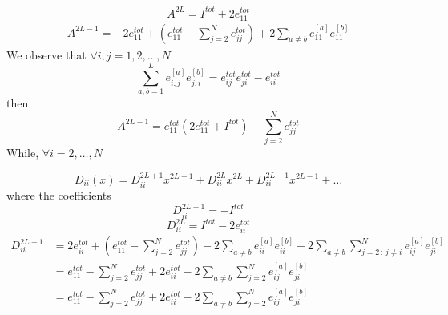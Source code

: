 \documentclass[11pt]{article}
\numberwithin{equation}{section}
\numberwithin{equation}{subsection}
\begin{document}
\begin{equation}
	A^{2L}=I^{tot}+2e_{11}^{tot}
\end{equation}
\begin{equation}
	\begin{split}
		A^{2L-1}=&2e_{11}^{tot}+\left(e_{11}^{tot}-\sum_{j=2}^{N}e_{jj}^{tot}\right)+2\sum_{a\neq b}e_{11}^{[a]}e_{11}^{[b]}
	\end{split}
\end{equation}
We observe that $\forall i,j=1,2,\ldots,N$
\begin{equation}
	\sum_{a,b=1}^{L}e_{i,j}^{[a]}e_{j,i}^{[b]}=e_{ij}^{tot}e_{ji}^{tot}-e_{ii}^{tot}
\end{equation}
then 
\begin{equation}
	\boxed{A^{2L-1}=e_{11}^{tot}\left(2e_{11}^{tot}+I^{tot}\right)-\sum_{j=2}^{N}e_{jj}^{tot}}
\end{equation}
While, $\forall i=2,\ldots,N$


\begin{equation}
	D_{ii}(x)=D_{ii}^{2L+1}x^{2L+1}+D_{ii}^{2L}x^{2L}+D_{ii}^{2L-1}x^{2L-1}+\ldots
\end{equation}
where the coefficients
\begin{equation}\label{a2lp}
	D_{ii}^{2L+1}=-I^{tot}
\end{equation}\begin{equation}\label{a2l}
	D_{ii}^{2L}=I^{tot}-2e_{ii}^{tot}
\end{equation}
\begin{equation}\label{a2lm1}
	\begin{split}
		D_{ii}^{2L-1}&=2e_{ii}^{tot}+\left(e_{11}^{tot}-\sum_{j=2}^{N}e_{jj}^{tot}\right)-2\sum_{a\neq b}e_{ii}^{[a]}e_{ii}^{[b]}-2\sum_{a\neq b}\sum_{j=2\,:\,j\neq i}^{N}e_{ij}^{[a]}e_{ji}^{[b]}\\
		&=e_{11}^{tot}-\sum_{j=2}^{N}e_{jj}^{tot}+2e_{ii}^{tot}-2\sum_{a\neq b}\sum_{j=2}^{N}e_{ij}^{[a]}e_{ji}^{[b]}\\
		&=e_{11}^{tot}-\sum_{j=2}^{N}e_{jj}^{tot}+2e_{ii}^{tot}-2\sum_{a\neq b}\sum_{j=2}^{N}e_{ij}^{[a]}e_{ji}^{[b]}\\ 
	\end{split}
\end{equation}
\end{document}

